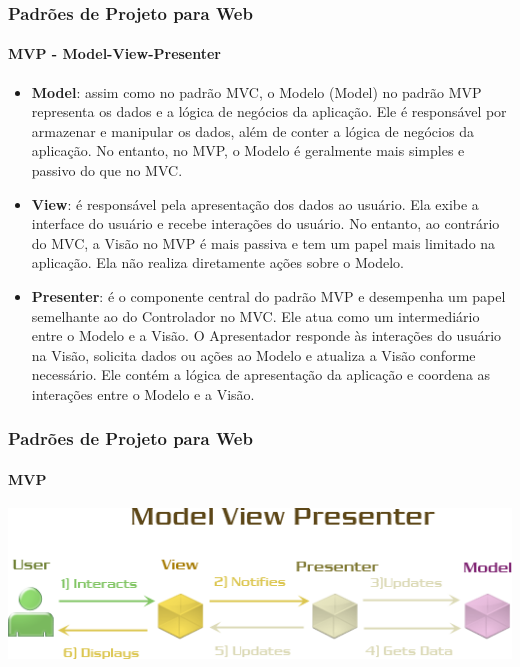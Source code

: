 \documentclass[
	9pt, %
	t, %
]{beamer}
\begin{document}
\begin{frame}
	\frametitle{Padrões de Projeto para Web}
	\framesubtitle{MVP - Model-View-Presenter}

	\begin{itemize}
		\item \textbf{Model}: assim como no padrão MVC, o Modelo (Model) no padrão MVP representa os dados e a lógica de negócios da aplicação. Ele é responsável por armazenar e manipular os dados, além de conter a lógica de negócios da aplicação. No entanto, no MVP, o Modelo é geralmente mais simples e passivo do que no MVC.
		\item \textbf{View}: é responsável pela apresentação dos dados ao usuário. Ela exibe a interface do usuário e recebe interações do usuário. No entanto, ao contrário do MVC, a Visão no MVP é mais passiva e tem um papel mais limitado na aplicação. Ela não realiza diretamente ações sobre o Modelo.
		\item \textbf{Presenter}: é o componente central do padrão MVP e desempenha um papel semelhante ao do Controlador no MVC. Ele atua como um intermediário entre o Modelo e a Visão. O Apresentador responde às interações do usuário na Visão, solicita dados ou ações ao Modelo e atualiza a Visão conforme necessário. Ele contém a lógica de apresentação da aplicação e coordena as interações entre o Modelo e a Visão.
	\end{itemize}

	
\end{frame}




\begin{frame}
	\frametitle{Padrões de Projeto para Web}
	\framesubtitle{MVP}

	\centering
	\includegraphics[width=0.8\linewidth]{Images/mvp2.png}

\end{frame}
\end{document}
